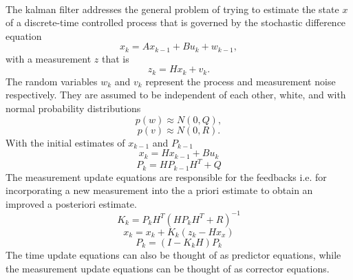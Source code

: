 \documentclass[a4paper,10pt]{report}
\begin{document}
\paragraph*{}
The kalman filter addresses the general problem of trying to estimate the state $x$ of a discrete-time controlled process that is
governed by the stochastic difference equation
\begin{equation}
 x_k = Ax_{k-1} + Bu_k + w_{k-1} ,
\end{equation}
with a measurement $z$ that is
\begin{equation}
 z_k = Hx_k + v_k.
\end{equation}
The random variables $w_k$ and $v_k$ represent the process and measurement noise respectively. They are assumed to be independent of each other, white, and with normal probability distributions
\begin{equation}
 p(w) \approx N(0,Q),
\end{equation}
\begin{equation}
 p(v) \approx N(0,R).
\end{equation}
With the initial estimates of $x_{k-1}$ and $P_{k-1}$
\begin{equation}
x_k = Hx_{k-1} + Bu_k
\end{equation}
\begin{equation}
P_k = HP_{k-1}H^T + Q
\end{equation}
The measurement update equations are responsible for the feedbacks i.e. for incorporating a new measurement into the a priori estimate
to obtain an improved a posteriori estimate.
\begin{equation}
K_k = P_kH^T(HP_kH^T + R)^{-1} \label{kalmangain}
\end{equation}
\begin{equation}
x_k = x_k + K_k(z_k - Hx_x)
\end{equation}
\begin{equation}
P_k = (I-K_kH)P_k
\end{equation}
The time update equations can also be thought of as predictor equations, while the measurement update equations can be thought of as corrector equations.
\end{document}
